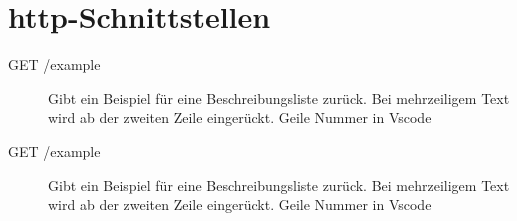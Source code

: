 \section{\acs{http}-Schnittstellen} %

\begin{description}
    \item[GET /example] Gibt ein Beispiel für eine Beschreibungsliste zurück.
          Bei mehrzeiligem Text wird ab der zweiten Zeile eingerückt. Geile Nummer in Vscode
    \item[GET /example] Gibt ein Beispiel für eine Beschreibungsliste zurück.
          Bei mehrzeiligem Text wird ab der zweiten Zeile eingerückt. Geile Nummer in Vscode
\end{description}

